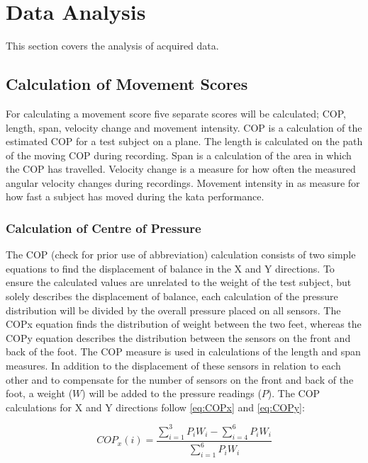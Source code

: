 \section{Data Analysis}
This section covers the analysis of acquired data.

\subsection{Calculation of Movement Scores}

For calculating a movement score five separate scores will be calculated; COP, length, span, velocity change and movement intensity. COP is a calculation of the estimated COP for a test subject on a plane. The length is calculated on the path of the moving COP during recording. Span is a calculation of the area in which the COP has travelled. Velocity change is a measure for how often the measured angular velocity changes during recordings. Movement intensity in as measure for how fast a subject has moved during the kata performance. 

\subsubsection{Calculation of Centre of Pressure}
The COP (check for prior use of abbreviation) calculation consists of two simple equations to find the displacement of balance in the X and Y directions. To ensure the calculated values are unrelated to the weight of the test subject, but solely describes the displacement of balance, each calculation of the pressure distribution will be divided by the overall pressure placed on all sensors. The COP\lowercase{x} equation finds the distribution of weight between the two feet, whereas the COP\lowercase{y} equation describes the distribution between the sensors on the front and back of the foot. The COP measure is used in calculations of the length and span measures. In addition to the displacement of these sensors in relation to each other and to compensate for the number of sensors on the front and back of the foot, a weight ($W$) will be added to the pressure readings ($P$).
The COP calculations for X and Y directions follow \eqref{eq:COPx} and \eqref{eq:COPy}:

\begin{equation} \label{eq:COPx}
COP_x(i) =  \frac{\sum_{i=1}^{3}P_i W_i - \sum_{i=4}^{6}P_i W_i}{\sum_{i=1}^{6}P_i W_i}
\end{equation} 

